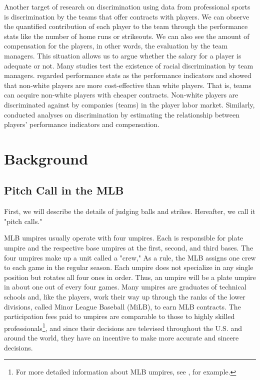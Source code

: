 \documentclass[dvipdfmx, 12pt]{jsarticle}
\begin{document}
Another target of research on discrimination using data from professional sports is discrimination by the teams that offer contracts with players.  We can observe the quantified contribution of each player to the team through the performance stats like the number of home runs or strikeouts.  We can also see the amount of compensation for the players, in other words, the evaluation by the team managers. This situation allows us to argue whether the salary for a player is adequate or not. Many studies test the existence of racial discrimination by team managers. \citet{Krautmann2000} regarded performance stats as the performance indicators and showed that non-white players are more cost-effective than white players. That is, teams can acquire non-white players with cheaper contracts. Non-white players are discriminated against by companies (teams) in the player labor market. Similarly, \citet{Holmes2011} conducted analyses on discrimination by estimating the relationship between players' performance indicators and compensation.

\section{Background}

\subsection{Pitch Call in the MLB}

First, we will describe the details of judging balls and strikes. Hereafter, we call it "pitch calls."

MLB umpires usually operate with four umpires. Each is responsible for plate umpire and the respective base umpires at the first, second, and third bases. The four umpires make up a unit called a "crew,"  As a rule, the MLB assigns one crew to each game in the regular season. Each umpire does not specialize in any single position but rotates all four ones in order. Thus, an umpire will be a plate umpire in about one out of every four games. Many umpires are graduates of technical schools and, like the players, work their way up through the ranks of the lower divisions, called Minor League Baseball (MiLB), to earn MLB contracts. The participation fees paid to umpires are comparable to those to highly skilled professionals\footnote{For more detailed information about MLB umpires, see \citet{umpire_detail}, for example.}, and since their decisions are televised throughout the U.S. and around the world, they have an incentive to make more accurate and sincere decisions.
\end{document}
